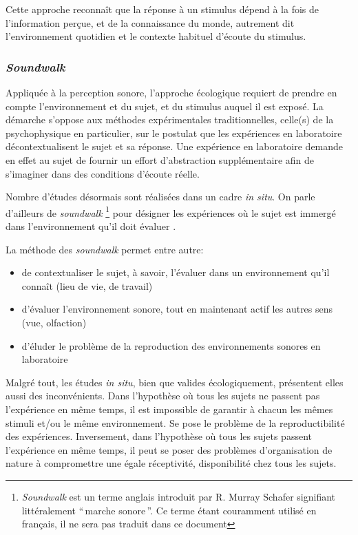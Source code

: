 Cette approche reconnaît que la réponse à un stimulus dépend à la fois de l'information perçue, et de la connaissance du monde, autrement dit l'environnement quotidien et le contexte habituel d'écoute du stimulus.

\subsubsection{\emph{Soundwalk}}

Appliquée à la perception sonore, l'approche écologique requiert de prendre en compte l'environnement et du sujet, et du stimulus auquel il est exposé. La démarche s'oppose aux méthodes expérimentales traditionnelles, celle(s) de la psychophysique en particulier, sur le postulat que les expériences en laboratoire décontextualisent le sujet et sa réponse. Une expérience en laboratoire demande en effet au sujet de fournir un effort d'abstraction supplémentaire afin de s’imaginer dans des conditions d'écoute réelle.

Nombre d'études désormais sont réalisées dans un cadre \emph{in situ}. On parle d'ailleurs de \emph{soundwalk}  \footnote{\emph{Soundwalk} est un terme anglais introduit par R. Murray Schafer \citep{schafer1969new} signifiant littéralement ``\,marche sonore\,''. Ce terme étant couramment utilisé en français, il ne sera pas traduit dans ce document} pour désigner les expériences où le sujet est immergé dans l'environnement qu'il doit évaluer \citep{adams2008soundwalking,jeon2013soundwalk}.


La méthode des \emph{soundwalk} permet entre autre:

\begin{itemize}
\item  de contextualiser le sujet, à savoir, l'évaluer dans un environnement qu'il connaît (lieu de vie, de travail)
\item d'évaluer l'environnement sonore, tout en maintenant actif les autres sens (vue, olfaction)
\item d'éluder le problème de la reproduction des environnements sonores en laboratoire
\end{itemize}

Malgré tout, les études \emph{in situ}, bien que valides écologiquement, présentent elles aussi des inconvénients. Dans l'hypothèse où tous les sujets ne passent pas l'expérience en même temps, il est impossible de garantir à chacun les mêmes stimuli et/ou le même environnement. Se pose le problème de la reproductibilité des expériences. Inversement, dans l'hypothèse où tous les sujets passent l'expérience en même temps, il peut se poser des problèmes d'organisation de nature à compromettre une égale réceptivité, disponibilité chez tous les sujets.

